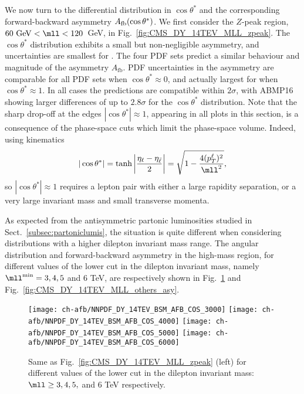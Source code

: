 We now turn to the differential distribution in
  $\cos\theta^*$ 
  and the corresponding forward-backward asymmetry $A_{\rm
    fb}(\cos\theta^*)$.
We first consider the $Z$-peak region, $60~{\rm GeV} < \mll <
120$~GeV, in Fig.~\ref{fig:CMS_DY_14TEV_MLL_zpeak}.
%
The $\cos\theta^*$ 
distribution exhibits a small but non-negligible asymmetry,
and uncertainties are  smallest for .
%
The four PDF sets predict a similar behaviour and magnitude
of the asymmetry $A_\mathrm{fb}$.
%
PDF uncertainties in the asymmetry
are  comparable for  all PDF sets when $\cos\theta^* \approx0$,
and actually  largest for  when $\cos\theta^* \approx 1$.
In all cases the predictions are compatible within $2 \sigma$,
with ABMP16 showing larger differences of up to $2.8 \sigma$ for the $\cos\theta^*$
distribution.
%
Note that the
sharp drop-off at the edges $|\cos\theta^*| \approx  1$, appearing in
all plots in this section, is a consequence of the phase-space cuts which
limit the phase-space volume.
%
Indeed, using  \lo kinematics
\begin{equation}
| \cos\theta^* | = \tanh \left| \frac{\eta_\ell - \eta_{\bar{\ell}}}{2} \right| = \sqrt{1 - \frac{4 (p_T^\ell)^2}{\mll^2}} \text{,}
\end{equation}
so $| \cos\theta^* | \approx 1$ requires a lepton pair with either
a large rapidity separation, or a very large invariant mass and small
transverse momenta. 

As expected from the antisymmetric partonic luminosities studied in
Sect.~\ref{subsec:partoniclumis}, the situation is quite different when
considering distributions with a higher dilepton invariant mass range.
%
The angular distribution and forward-backward asymmetry
in the high-mass region, for different values of the  lower cut in the dilepton
 invariant mass, namely $\mll^{\rm min}=3, 4,5$ and 6 TeV, are
 respectively
 shown in
Fig.~\ref{fig:CMS_DY_14TEV_MLL_others} and Fig.~\ref{fig:CMS_DY_14TEV_MLL_others_asy}.

\begin{figure}[t!]
 \centering
 \texttt{[image: ch-afb/NNPDF\_DY\_14TEV\_BSM\_AFB\_COS\_3000]}
 \texttt{[image: ch-afb/NNPDF\_DY\_14TEV\_BSM\_AFB\_COS\_4000]}
 \texttt{[image: ch-afb/NNPDF\_DY\_14TEV\_BSM\_AFB\_COS\_5000]}
 \texttt{[image: ch-afb/NNPDF\_DY\_14TEV\_BSM\_AFB\_COS\_6000]}
 \caption{Same as Fig.~\ref{fig:CMS_DY_14TEV_MLL_zpeak} (left)
   for different values of the  lower cut in the dilepton
   invariant mass: $\mll \ge 3, 4,5,$ and 6 TeV respectively.
  }    
 \label{fig:CMS_DY_14TEV_MLL_others}
\end{figure}

